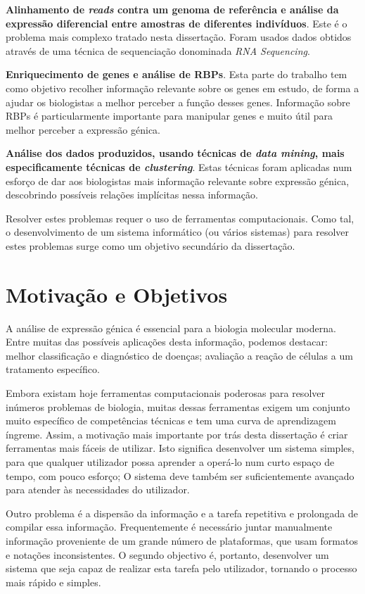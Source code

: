 \documentclass[9pt,a4paper]{extarticle}
\begin{document}
\begin{multicols}{2}
  \textbf{Alinhamento de \emph{reads} contra um genoma de referência e análise
  da expressão diferencial entre amostras de diferentes indivíduos}. Este é o
  problema mais complexo tratado nesta dissertação. Foram usados dados obtidos
  através de uma técnica de sequenciação donominada \emph{RNA
  Sequencing}.

  \textbf{Enriquecimento de genes e análise de RBPs}. Esta parte do trabalho
  tem como objetivo recolher informação relevante sobre os genes em estudo, de
  forma a ajudar os biologistas a melhor perceber a função desses genes.
  Informação sobre RBPs é particularmente importante para manipular genes e
  muito útil para melhor perceber a expressão génica.

  \textbf{Análise dos dados produzidos, usando técnicas de \emph{data mining},
  mais especificamente técnicas de \emph{clustering}}. Estas técnicas foram
  aplicadas num esforço de dar aos biologistas mais informação relevante sobre
  expressão génica, descobrindo possíveis relações implícitas nessa informação.

Resolver estes problemas requer o uso de ferramentas computacionais. Como tal,
o desenvolvimento de um sistema informático (ou vários sistemas) para resolver
estes problemas surge como um objetivo secundário da dissertação.

\section{Motivação e Objetivos} \label{sec:motivation}

A análise de expressão génica é essencial para a biologia molecular moderna.
Entre muitas das possíveis aplicações desta informação, podemos destacar:
melhor classificação e diagnóstico de doenças; avaliação a reação de células a
um tratamento específico.

Embora existam hoje ferramentas computacionais poderosas para resolver inúmeros
problemas de biologia, muitas dessas ferramentas exigem um conjunto muito
específico de competências técnicas e tem uma curva de aprendizagem íngreme.
Assim, a motivação mais importante por trás desta dissertação é criar
ferramentas mais fáceis de utilizar. Isto significa desenvolver um sistema
simples, para que qualquer utilizador possa aprender a operá-lo num curto espaço
de tempo, com pouco esforço; O sistema deve também ser suficientemente avançado
para atender às necessidades do utilizador.

Outro problema é a dispersão da informação e a tarefa repetitiva e prolongada de
compilar essa informação. Frequentemente é necessário juntar manualmente
informação proveniente de um grande número de plataformas, que usam formatos e
notações inconsistentes. O segundo objectivo é, portanto, desenvolver um sistema
que seja capaz de realizar esta tarefa pelo utilizador, tornando o processo mais
rápido e simples.


\end{multicols}
\end{document}
